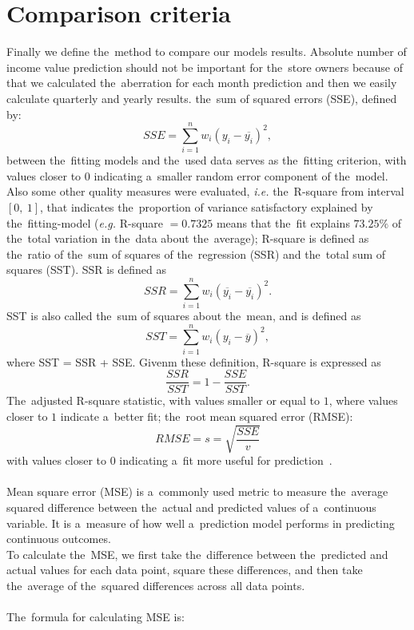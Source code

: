     \section{Comparison criteria}\label{subsec:comparison}
    Finally we define the~method to compare our models results.
    Absolute number of income value prediction should not be important for the~store owners because of that we
    calculated the~aberration for each month prediction and then we easily calculate quarterly and yearly results.
    the~sum of squared errors (SSE), defined by:
    $$SSE = \sum^n_{i=1}w_i(y_i - \overline{y_i})^2,$$
    between the~fitting models and the~used data serves as the~fitting criterion,
    with values closer to $0$ indicating a~smaller random error component of the~model.
    Also some other quality measures were evaluated, \textit{i.e.} the~R-square from interval $[0,\ 1]$,
    that indicates the~proportion of variance satisfactory explained by the~fitting-model (\textit{e.g.}
    R-square $= 0.7325$ means that the~fit explains $73.25\%$ of the~total variation in the~data about the~average);
    R-square is defined as the~ratio of the~sum of squares of the~regression (SSR) and the~total sum of squares (SST).
    SSR is defined as
    $$SSR = \sum_{i=1}^nw_i(\overline{y_i} - \overline{y_i})^2.$$
    SST is also called the~sum of squares about the~mean, and is defined as
    $$SST = \sum_{i=1}^nw_i(y_i - \overline{y})^2,$$
    where SST = SSR + SSE. Givenm these definition, R-square is expressed as
    $$\frac{SSR}{SST} = 1 - \frac{SSE}{SST}.$$
    The~adjusted R-square statistic, with values smaller or equal to $1$, where values closer to $1$ indicate a~better
    fit; the~root mean squared error (RMSE):\\
    $$RMSE = s = \sqrt{\frac{SSE}{v}}$$
    with values closer to $0$ indicating a~fit more useful for prediction~\cite{Jandera2021}.\\
    \\
    Mean square error (MSE) is a~commonly used metric to measure the~average squared difference between the~actual and
    predicted values of a~continuous variable. It is a~measure of how well a~prediction model performs in predicting
    continuous outcomes.\\
    To calculate the~MSE, we first take the~difference between the~predicted and actual values for each data point,
    square these differences, and then take the~average of the~squared differences across all data points.\\
    \\
   The~formula for calculating MSE is:

